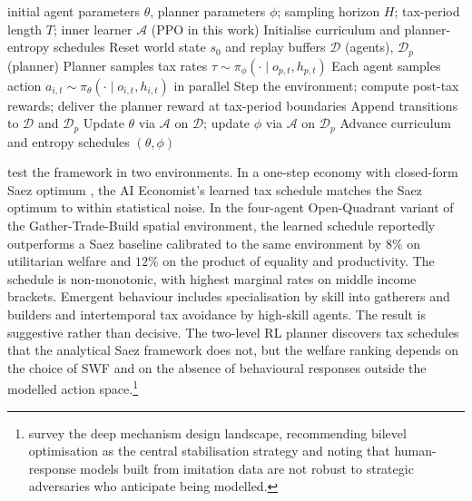 \begin{algorithm}[t]
\caption{Two-level Reinforcement Learning, after \citet{Zheng2022aie}}
\label{alg:macro:aie}
\begin{algorithmic}[1]
\Require initial agent parameters $\theta$, planner parameters $\phi$; sampling horizon $H$; tax-period length $T$; inner learner $\mathcal{A}$ (PPO in this work)
\State Initialise curriculum and planner-entropy schedules
  \State Reset world state $s_0$ and replay buffers $\mathcal{D}$ (agents), $\mathcal{D}_p$ (planner)
      \State Planner samples tax rates $\tau \sim \pi_\phi(\cdot \mid o_{p,t}, h_{p,t})$
    \EndIf
    \State Each agent samples action $a_{i,t} \sim \pi_\theta(\cdot \mid o_{i,t}, h_{i,t})$ in parallel
    \State Step the environment; compute post-tax rewards; deliver the planner reward at tax-period boundaries
    \State Append transitions to $\mathcal{D}$ and $\mathcal{D}_p$
  \EndFor
  \State Update $\theta$ via $\mathcal{A}$ on $\mathcal{D}$; update $\phi$ via $\mathcal{A}$ on $\mathcal{D}_p$
  \State Advance curriculum and entropy schedules
\EndWhile
\State \Return $(\theta, \phi)$
\end{algorithmic}
\end{algorithm}

\citet{Zheng2022aie} test the framework in two environments. In a
one-step economy with closed-form Saez optimum \citep{Saez2001}, the
AI Economist's learned tax schedule matches the Saez optimum to
within statistical noise. In the four-agent Open-Quadrant variant of
the Gather-Trade-Build spatial environment, the learned schedule
reportedly outperforms a Saez baseline calibrated to the same
environment by $8\%$ on utilitarian welfare and $12\%$ on the product
of equality and productivity. The schedule is non-monotonic, with
highest marginal rates on middle income brackets. Emergent behaviour
includes specialisation by skill into gatherers and builders and
intertemporal tax avoidance by high-skill agents. The result is
suggestive rather than decisive. The two-level RL planner discovers
tax schedules that the analytical Saez framework does not, but the
welfare ranking depends on the choice of SWF and on the absence of
behavioural responses outside the modelled action
space.\footnote{\citet{Tacchetti2025dmd} survey the deep mechanism
design landscape, recommending bilevel optimisation as the central
stabilisation strategy and noting that human-response models built
from imitation data are not robust to strategic adversaries who
anticipate being modelled.}

